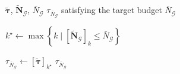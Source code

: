 \begin{algorithm}[ht]
\caption{\textbf{Finding the budget-matching threshold}}
\label{alg:find_budget_threshold}
\begin{algorithmic}[1]
\Require $\tilde{\boldsymbol{\tau}}$, $\tilde{\mathbf{N}}_{\mathcal{G}}$, $\bar{N}_{\mathcal{G}}$
\Ensure $\tau_{\bar{N}_{\mathcal{G}}}$ satisfying the target budget $\bar{N}_{\mathcal{G}}$

\State $k^\star \leftarrow \max \left\{ k \mid [\tilde{\mathbf{N}}_{\mathcal{G}}]_{k} \le \bar{N}_{\mathcal{G}} \right\}$ 

\State $\tau_{\bar{N}_{\mathcal{G}}} \leftarrow [\tilde{\boldsymbol{\tau}}]_{k^\star}$
\State \Return $\tau_{\bar{N}_{\mathcal{G}}}$
\end{algorithmic}
\end{algorithm}